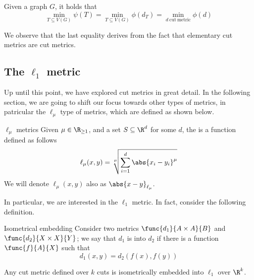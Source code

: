 \documentclass[a4paper, 12pt]{report}
\begin{document}
    \begin{framedcor}{}
        Given a graph $G$, it holds that $$\min_{T \subseteq V(G)}{\psi(T)} = \min_{T \subseteq V(G)}{\phi(d_T)} = \min_{d \ \mathrm{cut \ metric}}{\phi(d)}$$
    \end{framedcor}

    We observe that the last equality derives from the fact that elementary cut metrics are  cut metrics.

    \subsection{The $\ell_1$ metric}

    Up until this point, we have explored cut metrics in great detail. In the following section, we are going to shift our focus towards other types of metrics, in patricular the $\ell_\mu$ type of metrics, which are defined as shown below.

    \begin{frameddefn}{$\ell_\mu$ metrics}
        Given $\mu \in \R_{\ge 1}$, and a set $S \subseteq \R^d$ for some $d$, the  is a function defined as follows $$\ell_\mu(x, y) = \sqrt[\mu]{\sum_{i = 1}^d{\abs{x_i - y_i}^\mu}}$$ We will denote $\ell_\mu(x, y)$ also as $\abs{x - y}_{\ell_\mu}$.
    \end{frameddefn}

    In particular, we are interested in the $\ell_1$ metric. In fact, consider the following definition.

    \begin{frameddefn}{Isometrical embedding}
        Consider two metrics $\func{d_1}{A \times A}{B}$ and $\func{d_2}{X \times X}{Y}$; we say that $d_1$ is  into $d_2$ if there is a function $\func{f}{A}{X}$ such that $$d_1(x, y) = d_2(f(x), f(y))$$
    \end{frameddefn}

    \begin{framedlem}{}
        Any cut metric defined over $k$ cuts is isometrically embedded into $\ell_1$ over $\R^k$.
    \end{framedlem}
\end{document}
